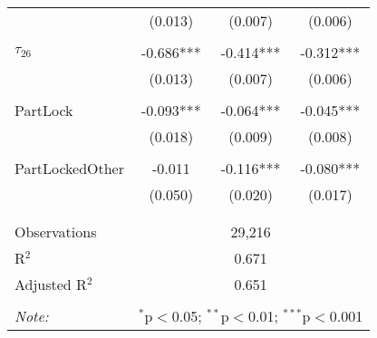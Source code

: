 \begin{tabular}{@{\extracolsep{-0pt}}lccc}
                &  (0.013)  &  (0.007)  &  (0.006)  \\
                &           &           &           \\[-2.1ex]
$\tau_{26}$     & -0.686*** & -0.414*** & -0.312*** \\
                &  (0.013)  &  (0.007)  &  (0.006)  \\
                &           &           &           \\[-2.1ex]
PartLock        & -0.093*** & -0.064*** & -0.045*** \\
                &  (0.018)  &  (0.009)  &  (0.008)  \\
                &           &           &           \\[-2.1ex]
PartLockedOther &   -0.011  & -0.116*** & -0.080*** \\
                &  (0.050)  &  (0.020)  &  (0.017)  \\
                &           &           &           \\[-2.1ex]

\hline \\[-1.8ex] 
Observations     & \multicolumn{3}{c}{29,216} \\ 
R$^{2}$          & \multicolumn{3}{c}{0.671 } \\ 
Adjusted R$^{2}$ & \multicolumn{3}{c}{0.651 } \\ 
\hline 
\hline \\[-1.8ex] 
\textit{Note:}  & \multicolumn{3}{r}{$^{*}$p$<$0.05; $^{**}$p$<$0.01; $^{***}$p$<$0.001} \\ 
\end{tabular} 